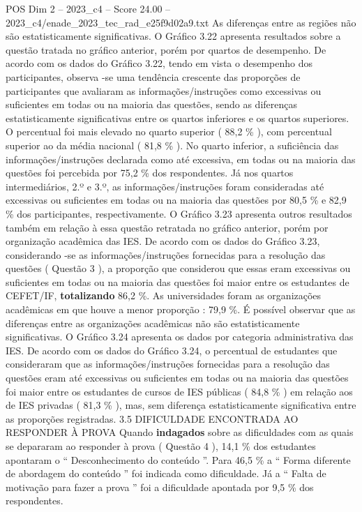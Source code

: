 \begin{textsample}{POS Dim 2 – 2023\_c4 – Score 24.00 – 2023\_c4/enade\_2023\_tec\_rad\_e25f9d02a9.txt}
As diferenças entre as regiões não são estatisticamente significativas.
O Gráfico 3.22 apresenta resultados sobre a questão tratada no gráfico anterior, porém por quartos de desempenho.
De acordo com os dados do Gráfico 3.22, tendo em vista o desempenho dos participantes, observa -se uma tendência crescente das proporções de participantes que avaliaram as informações/instruções como excessivas ou suficientes em todas ou na maioria das questões, sendo as diferenças estatisticamente significativas entre os quartos inferiores e os quartos superiores.
O percentual foi mais elevado no quarto superior ( 88,2 \% ), com percentual superior ao da média nacional ( 81,8 \% ).
No quarto inferior, a suficiência das informações/instruções declarada como até excessiva, em todas ou na maioria das questões foi percebida por 75,2 \% dos respondentes.
Já nos quartos intermediários, 2.º e 3.º, as informações/instruções foram consideradas até excessivas ou suficientes em todas ou na maioria das questões por 80,5 \% e 82,9 \% dos participantes, respectivamente.
O Gráfico 3.23 apresenta outros resultados também em relação à essa questão retratada no gráfico anterior, porém por organização acadêmica das IES.
De acordo com os dados do Gráfico 3.23, considerando -se as informações/instruções fornecidas para a resolução das questões ( Questão 3 ), a proporção que considerou que essas eram excessivas ou suficientes em todas ou na maioria das questões foi maior entre os estudantes de CEFET/IF, \textbf{totalizando} 86,2 \%.
As universidades foram as organizações acadêmicas em que houve a menor proporção : 79,9 \%.
É possível observar que as diferenças entre as organizações acadêmicas não são estatisticamente significativas.
O Gráfico 3.24 apresenta os dados por categoria administrativa das IES.
De acordo com os dados do Gráfico 3.24, o percentual de estudantes que consideraram que as informações/instruções fornecidas para a resolução das questões eram até excessivas ou suficientes em todas ou na maioria das questões foi maior entre os estudantes de cursos de IES públicas ( 84,8 \% ) em relação aos de IES privadas ( 81,3 \% ), mas, sem diferença estatisticamente significativa entre as proporções registradas. 3.5 DIFICULDADE ENCONTRADA AO RESPONDER À PROVA Quando \textbf{indagados} sobre as dificuldades com as quais se depararam ao responder à prova ( Questão 4 ), 14,1 \% dos estudantes apontaram o “ Desconhecimento do conteúdo ”.
Para 46,5 \% a “ Forma diferente de abordagem do conteúdo ” foi indicada como dificuldade.
Já a “ Falta de motivação para fazer a prova ” foi a dificuldade apontada por 9,5 \% dos respondentes.

\end{textsample}
